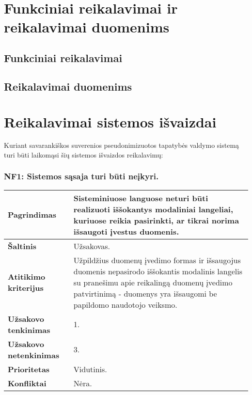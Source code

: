 \documentclass[12pt]{article}
\begin{document}
\section{Funkciniai reikalavimai ir reikalavimai duomenims}
\subsection{Funkciniai reikalavimai}

\subsection{Reikalavimai duomenims} %

\newpage

\section{Reikalavimai sistemos išvaizdai}
Kuriant savarankiškos suverenios pseudonimizuotos tapatybės valdymo sistemą
turi būti laikomąsi šių sistemos išvaizdos reikalavimų:

\subsubsection*{NF1: Sistemos sąsaja turi būti neįkyri.}
\label{sec:NF1}
\begin{table}[htb!]
    \captionsetup{justification=centering}
    \begin{tabular}{|m{4.9cm}|m{11cm}|}
        \hline
        \raggedleft \textbf{\cellcolor{orange!30}Pagrindimas} &
        Sisteminiuose languose neturi būti realizuoti iššokantys modaliniai
        langeliai, kuriuose reikia pasirinkti, ar tikrai norima išsaugoti
        įvestus duomenis. \\
        \hline
        \raggedleft \textbf{\cellcolor{orange!30}Šaltinis} & Užsakovas. \\
        \hline
        \raggedleft \textbf{\cellcolor{orange!30}Atitikimo kriterijus} & 
        Užpildžius duomenų įvedimo formas ir išsaugojus duomenis nepasirodo
        iššokantis modalinis langelis su pranešimu apie reikalingą duomenų
        įvedimo patvirtinimą - duomenys yra išsaugomi be papildomo naudotojo
        veiksmo. \\
        \hline
        \raggedleft \textbf{\cellcolor{orange!30}Užsakovo tenkinimas} & 1. \\
        \hline
        \raggedleft \textbf{\cellcolor{orange!30}Užsakovo netenkinimas} & 3. \\
        \hline
        \raggedleft \textbf{\cellcolor{orange!30}Prioritetas} & Vidutinis. \\
        \hline
        \raggedleft \textbf{\cellcolor{orange!30}Konfliktai} & Nėra. \\
        \hline
    \end{tabular}
\end{table}
\end{document}
